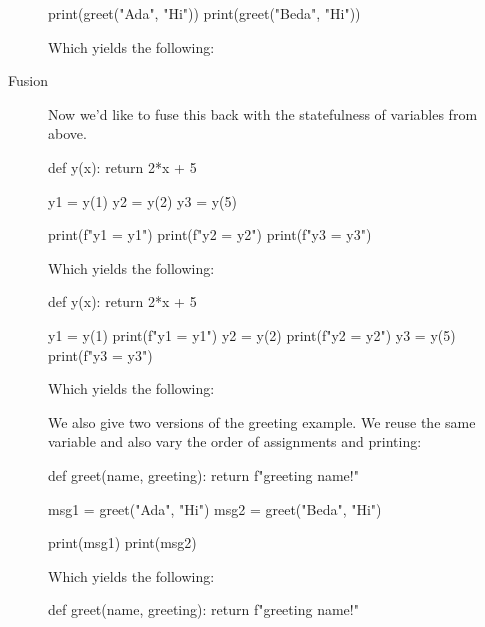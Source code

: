 \begin{description}
\begin{minipage}[t]{0.45\columnwidth}
\begin{pyblock}[funcG2]
print(greet("Ada", "Hi"))
print(greet("Beda", "Hi"))
      \end{pyblock}

      \vspace{0.5em}
      Which yields the following:
      \printpythontex[verbatim]
    \end{minipage}

  \item[Fusion] Now we'd like to fuse this back with the statefulness of 
    variables from above.

    \begin{minipage}[t]{0.45\columnwidth}
      \begin{pyblock}[funcG1]
def y(x):
  return 2*x + 5

y1 = y(1)
y2 = y(2)
y3 = y(5)

print(f"y1 = {y1}")
print(f"y2 = {y2}")
print(f"y3 = {y3}")
      \end{pyblock}

      \vspace{0.5em}
      Which yields the following:
      \printpythontex[verbatim]
    \end{minipage}
    \hfill
    \begin{minipage}[t]{0.45\columnwidth}
      \begin{pyblock}[funcG1]
def y(x):
  return 2*x + 5


y1 = y(1)
print(f"y1 = {y1}")
y2 = y(2)
print(f"y2 = {y2}")
y3 = y(5)
print(f"y3 = {y3}")
      \end{pyblock}

      \vspace{0.5em}
      Which yields the following:
      \printpythontex[verbatim]
    \end{minipage}

    We also give two versions of the greeting example.
    We reuse the same variable and also vary the order of assignments and 
    printing:


    \begin{minipage}[t]{0.45\columnwidth}
      \begin{pyblock}[funcG2]
def greet(name, greeting):
  return f"{greeting} {name}!"

msg1 = greet("Ada", "Hi")
msg2 = greet("Beda", "Hi")

print(msg1)
print(msg2)
      \end{pyblock}

      \vspace{0.5em}
      Which yields the following:
      \printpythontex[verbatim]
    \end{minipage}
    \hfill
    \begin{minipage}[t]{0.45\columnwidth}
      \begin{pyblock}[funcG2]
def greet(name, greeting):
  return f"{greeting} {name}!"


\end{pyblock}
\end{minipage}
\end{description}
